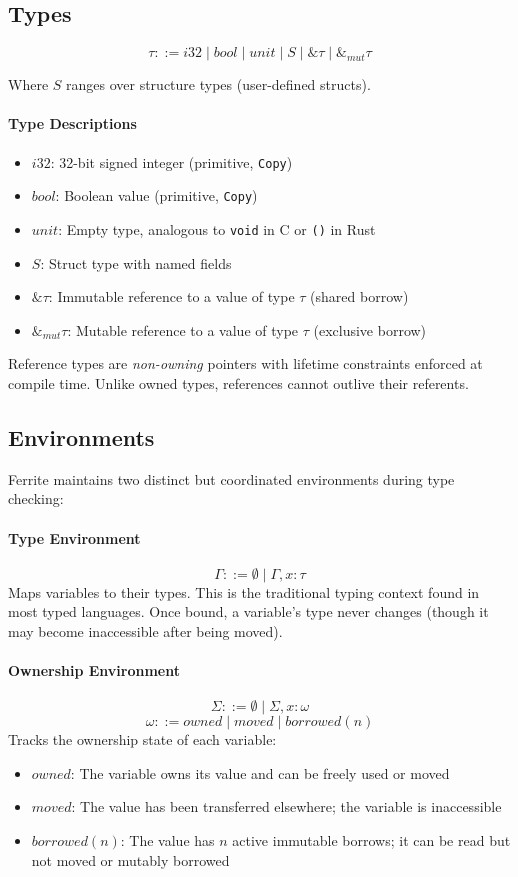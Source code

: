 \documentclass[11pt,a4paper,twoside]{book}
\begin{document}
\subsection{Types}

\[
\tau ::= i32 \mid bool \mid unit \mid S \mid \&\tau \mid \&_{mut}\tau
\]

Where $S$ ranges over structure types (user-defined structs).

\paragraph{Type Descriptions}
\begin{itemize}
  \item $i32$: 32-bit signed integer (primitive, \texttt{Copy})
  \item $bool$: Boolean value (primitive, \texttt{Copy})
  \item $unit$: Empty type, analogous to \texttt{void} in C or \texttt{()} in Rust
  \item $S$: Struct type with named fields
  \item $\&\tau$: Immutable reference to a value of type $\tau$ (shared borrow)
  \item $\&_{mut}\tau$: Mutable reference to a value of type $\tau$ (exclusive borrow)
\end{itemize}

Reference types are \emph{non-owning} pointers with lifetime constraints enforced
at compile time. Unlike owned types, references cannot outlive their referents.


\subsection{Environments}

Ferrite maintains two distinct but coordinated environments during type checking:

\paragraph{Type Environment}
\[
\Gamma ::= \emptyset \mid \Gamma, x : \tau
\]
Maps variables to their types. This is the traditional typing context found in
most typed languages. Once bound, a variable's type never changes (though it may
become inaccessible after being moved).

\paragraph{Ownership Environment}
\[
\Sigma ::= \emptyset \mid \Sigma, x : \omega
\]
\[
\omega ::= owned \mid moved \mid borrowed(n)
\]
Tracks the ownership state of each variable:
\begin{itemize}
  \item $owned$: The variable owns its value and can be freely used or moved
  \item $moved$: The value has been transferred elsewhere; the variable is
    inaccessible
  \item $borrowed(n)$: The value has $n$ active immutable borrows; it can be read
    but not moved or mutably borrowed
\end{itemize}
\end{document}
